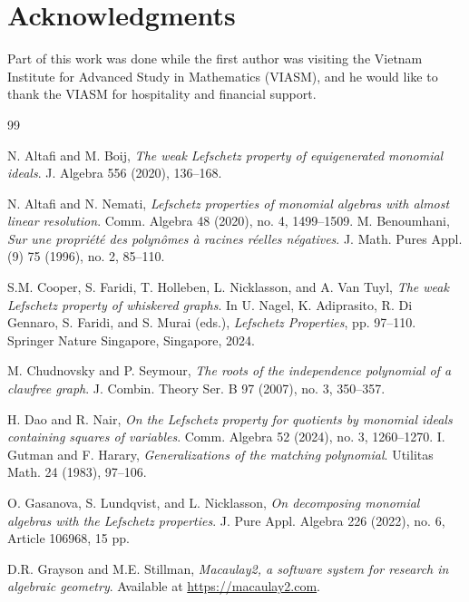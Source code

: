 \documentclass[12pt,twoside]{amsart}
\theoremstyle{definition}
\theoremstyle{mystyle}
\begin{document}
 





\section*{Acknowledgments}
Part of this work was done while the first author was visiting the Vietnam Institute for Advanced Study in Mathematics (VIASM), and he would like to thank the VIASM for hospitality and financial support.



\begin{thebibliography}{99}
	
	N. Altafi and M. Boij,
	\emph{The weak Lefschetz property of equigenerated monomial ideals}.
	J. Algebra 556 (2020), 136--168.
	
	N. Altafi and N. Nemati,
	\emph{Lefschetz properties of monomial algebras with almost linear resolution}.
	Comm. Algebra 48 (2020), no. 4, 1499--1509.
M. Benoumhani,
\emph{Sur une propri\'et\'e des polyn\^omes \`a racines r\'eelles
n\'egatives}.
J. Math. Pures Appl. (9) 75 (1996), no. 2, 85--110.

    
	
	S.M. Cooper, S. Faridi, T. Holleben, L. Nicklasson, and A. Van Tuyl,
	\emph{The weak Lefschetz property of whiskered graphs}.
	In U. Nagel, K. Adiprasito, R. Di Gennaro, S. Faridi, and S. Murai (eds.),
	\emph{Lefschetz Properties}, pp. 97--110.
	Springer Nature Singapore, Singapore, 2024.

	M. Chudnovsky and P. Seymour,
	\emph{The roots of the independence polynomial of a clawfree graph}.
	J. Combin. Theory Ser. B 97 (2007), no. 3, 350--357.
    
	
	
	H. Dao and R. Nair,
	\emph{On the Lefschetz property for quotients by monomial ideals containing squares of variables}.
	Comm. Algebra 52 (2024), no. 3, 1260--1270.
I. Gutman and F. Harary,
\emph{Generalizations of the matching polynomial}.
Utilitas Math. 24 (1983), 97--106.
    
	O. Gasanova, S. Lundqvist, and L. Nicklasson,
	\emph{On decomposing monomial algebras with the Lefschetz properties}.
	J. Pure Appl. Algebra 226 (2022), no. 6, Article 106968, 15 pp.
	
D.R. Grayson and M.E. Stillman,
\emph{Macaulay2, a software system for research in algebraic geometry}.
Available at \url{https://macaulay2.com}.
	

\end{thebibliography}
\end{document}
